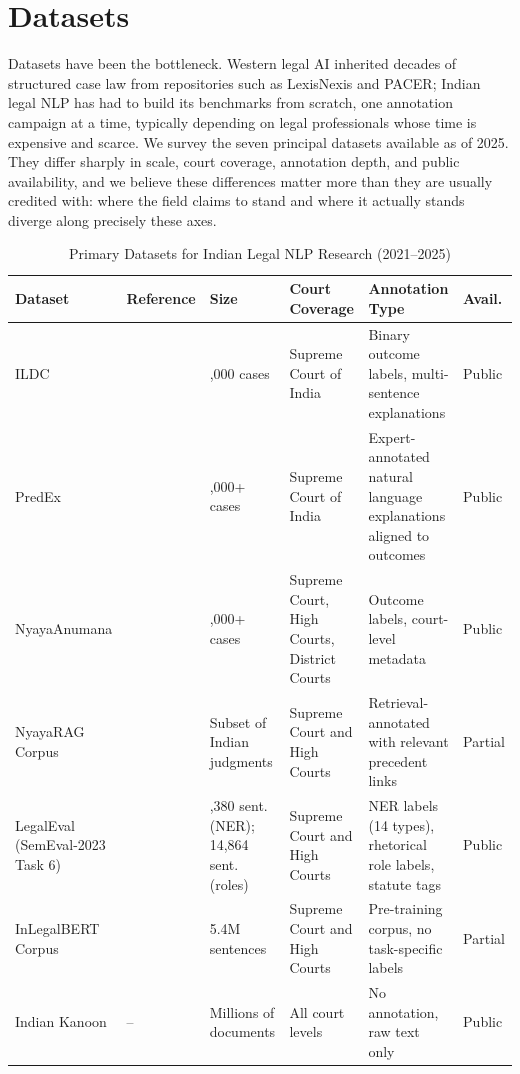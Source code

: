 \section{Datasets}

Datasets have been the bottleneck. Western legal AI inherited decades of structured case law from repositories such as LexisNexis and PACER; Indian legal NLP has had to build its benchmarks from scratch, one annotation campaign at a time, typically depending on legal professionals whose time is expensive and scarce. We survey the seven principal datasets available as of 2025. They differ sharply in scale, court coverage, annotation depth, and public availability, and we believe these differences matter more than they are usually credited with: where the field claims to stand and where it actually stands diverge along precisely these axes.

\begin{table}[t]
\centering
\caption{Primary Datasets for Indian Legal NLP Research (2021--2025)}
\label{tab:datasets}
\begin{tabular}{>{\raggedright\arraybackslash}p{2.4cm} >{\centering\arraybackslash}p{1.8cm} >{\raggedright\arraybackslash}p{1.8cm} >{\raggedright\arraybackslash}p{2.4cm} >{\raggedright\arraybackslash}p{4.2cm} >{\centering\arraybackslash}p{1.2cm}}
\toprule
\textbf{Dataset} & \textbf{Reference} & \textbf{Size} & \textbf{Court Coverage} & \textbf{Annotation Type} & \textbf{Avail.} \\
\midrule
ILDC & \cite{malik-etal-2021-ildc} & 35,000 cases & Supreme Court of India & Binary outcome labels, multi-sentence explanations & Public \\
\addlinespace
PredEx & \cite{nigam-etal-2024-predex} & 15,000+ cases & Supreme Court of India & Expert-annotated natural language explanations aligned to outcomes & Public \\
\addlinespace
NyayaAnumana & \cite{nigam-etal-2025-nyayaanumana} & 700,000+ cases & Supreme Court, High Courts, District Courts & Outcome labels, court-level metadata & Public \\
\addlinespace
NyayaRAG Corpus & \cite{nigam-etal-2025-nyayarag} & Subset of Indian judgments & Supreme Court and High Courts & Retrieval-annotated with relevant precedent links & Partial \\
\addlinespace
LegalEval (SemEval-2023 Task 6) & \cite{modi-etal-2023-semeval} & 9,380 sent. (NER); 14,864 sent. (roles) & Supreme Court and High Courts & NER labels (14 types), rhetorical role labels, statute tags & Public \\
\addlinespace
InLegalBERT Corpus & \cite{paul-etal-2023-inlegalbert} & 5.4M sentences & Supreme Court and High Courts & Pre-training corpus, no task-specific labels & Partial \\
\addlinespace
Indian Kanoon & -- & Millions of documents & All court levels & No annotation, raw text only & Public \\
\bottomrule
\end{tabular}
\end{table}

